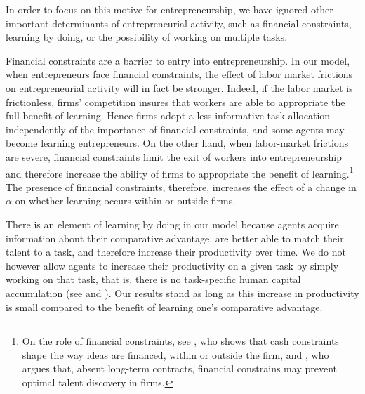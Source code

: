 \documentclass[12pt,american]{paper}
\theoremstyle{remark}
\begin{document}
In order to focus on this motive for entrepreneurship, we have ignored other important determinants of entrepreneurial activity, such as financial constraints, learning by doing, or the possibility of working on multiple tasks. 

Financial constraints are a barrier to entry into entrepreneurship. In our model, when entrepreneurs face financial constraints, the effect of labor market frictions on entrepreneurial activity will in fact be stronger. Indeed, if the labor market is frictionless, firms' competition insures that workers are able to appropriate the full benefit of learning.  Hence firms adopt a less informative task allocation independently of the importance of financial constraints, and some agents may become learning entrepreneurs. On the other hand, when labor-market frictions are severe, financial constraints limit the exit of workers into entrepreneurship and therefore increase the ability of firms to appropriate the benefit of learning.\footnote{On the role of financial constraints, see \citet{Hellmann:2007tk}, who shows that cash constraints shape the way ideas are financed, within or outside the firm, and \citet{tervio_superstars_2009}, who argues that, absent long-term contracts, financial constrains may prevent optimal talent discovery in firms.}  The presence of financial constraints, therefore, increases the effect of a change in $\alpha$ on whether learning occurs within or outside firms.



There is an element of learning by doing in our model because agents acquire information about their comparative advantage, are better able to match their talent to a task, and therefore increase their productivity over time.  We do not however allow agents to increase their productivity on a given task by simply working on that task, that is, there is no task-specific human capital accumulation (see \citealp{gibbons1999theory} and \citealp{gibbons2004task}).
Our results stand as long as this increase in productivity is small compared to the benefit of learning one's comparative advantage.  
  
\end{document}
